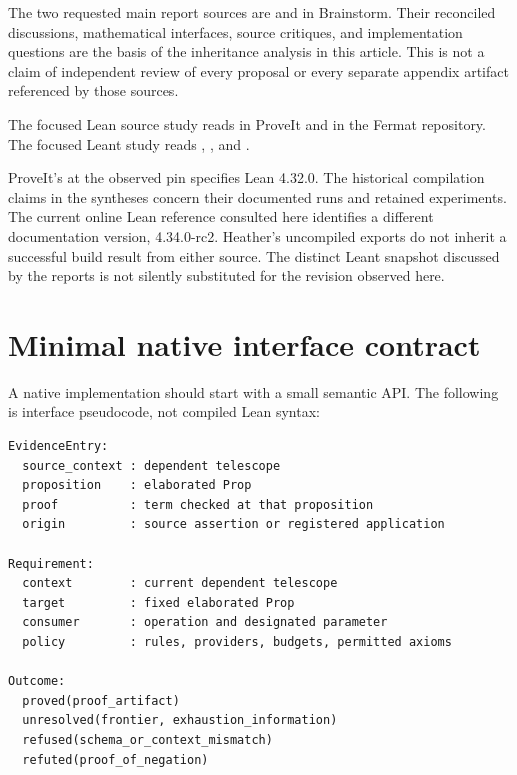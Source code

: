 \documentclass[11pt,letterpaper]{article}
\newcommand{\code}[1]{\texttt{\detokenize{#1}}}
\theoremstyle{definition}\newtheorem{definition}[theorem]{Definition}
\theoremstyle{remark}\newtheorem{remark}[theorem]{Remark}
\begin{document}
The two requested main report sources are
 and
 in Brainstorm. Their
reconciled discussions, mathematical interfaces, source critiques, and
implementation questions are the basis of the inheritance analysis in this
article. This is not a claim of independent review of every proposal or every
separate appendix artifact referenced by those sources.

The focused Lean source study reads
in ProveIt and
in the Fermat repository. The focused Leant study reads
,
, and
.

ProveIt's  at the observed pin specifies Lean 4.32.0.
The historical compilation claims in the syntheses concern their documented
runs and retained experiments. The current online Lean reference consulted
here identifies a different documentation version, 4.34.0-rc2. Heather's
uncompiled exports do not inherit a successful build result from either source.
The distinct Leant snapshot \code{823259f7} discussed by the reports is not
silently substituted for the \code{main} revision observed here.

\clearpage
\section{Minimal native interface contract}\label{app:interface}

A native implementation should start with a small semantic API. The following
is interface pseudocode, not compiled Lean syntax:
\par\noindent\begin{minipage}{\linewidth}
\begin{lstlisting}
EvidenceEntry:
  source_context : dependent telescope
  proposition    : elaborated Prop
  proof          : term checked at that proposition
  origin         : source assertion or registered application

Requirement:
  context        : current dependent telescope
  target         : fixed elaborated Prop
  consumer       : operation and designated parameter
  policy         : rules, providers, budgets, permitted axioms

Outcome:
  proved(proof_artifact)
  unresolved(frontier, exhaustion_information)
  refused(schema_or_context_mismatch)
  refuted(proof_of_negation)
\end{lstlisting}
\end{minipage}\par
\end{document}
